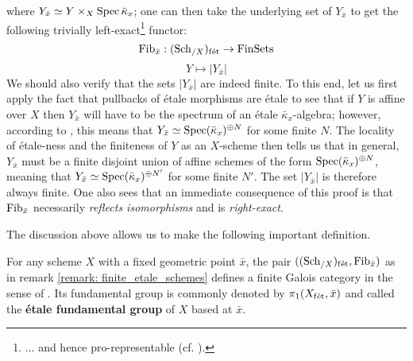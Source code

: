 \begin{remark}
                    where $Y_{\bar{x}} \cong Y \x_X \Spec \bar{\kappa}_x$; one can then take the underlying set of $Y_{\bar{x}}$ to get the following trivially left-exact\footnote{... and hence pro-representable (cf. \cite[Proposition 3.1]{grothendieck_fga_2}).} functor:
                        $$\mathrm{Fib}_{\bar{x}}: (\mathrm{Sch}_{/X})_{\mathrm{f\acute{e}t}} \to \mathrm{Fin}\mathrm{Sets}$$
                        $$Y \mapsto |Y_{\bar{x}}|$$
                    We should also verify that the sets $|Y_{\bar{x}}|$ are indeed finite. To this end, let us first apply the fact that pullbacks of \'etale morphisms are \'etale to see that if $Y$ is affine over $X$ then $Y_{\bar{x}}$ will have to be the spectrum of an \'etale $\bar{\kappa}_x$-algebra; however, according to \cite[\href{https://stacks.math.columbia.edu/tag/00U3}{Tag 00U3}]{stacks}, this means that $Y_{\bar{x}} \simeq \operatorname{Spec} (\bar{\kappa}_x)^{\oplus N}$ for some finite $N$. The locality of \'etale-ness and the finiteness of $Y$ as an $X$-scheme then tells us that in general, $Y_{\bar{x}}$ must be a finite disjoint union of affine schemes of the form $\operatorname{Spec} (\bar{\kappa}_x)^{\oplus N}$, meaning that $Y_{\bar{x}} \simeq \operatorname{Spec} (\bar{\kappa}_x)^{\oplus N'}$ for some finite $N'$. The set $|Y_{\bar{x}}|$ is therefore always finite. One also sees that an immediate consequence of this proof is that $\mathrm{Fib}_{\bar{x}}$ necessarily \textit{reflects isomorphisms} and is \textit{right-exact}. 
                \end{remark}
                
                The discussion above allows us to make the following important definition.
                \begin{definition} \label{def: etale_fundamental_groups}
                    For any scheme $X$ with a fixed geometric point $\bar{x}$, the pair $((\mathrm{Sch}_{/X})_{\mathrm{f\acute{e}t}}, \mathrm{Fib}_{\bar{x}})$ as in remark \ref{remark: finite_etale_schemes} defines a finite Galois category in the sense of \cite[Section 1]{}. Its fundamental group is commonly denoted by $\pi_1(X_{\mathrm{f\acute{e}t}}, \bar{x})$ and called the \textbf{\'etale fundamental group} of $X$ based at $\bar{x}$.
                \end{definition}
                
